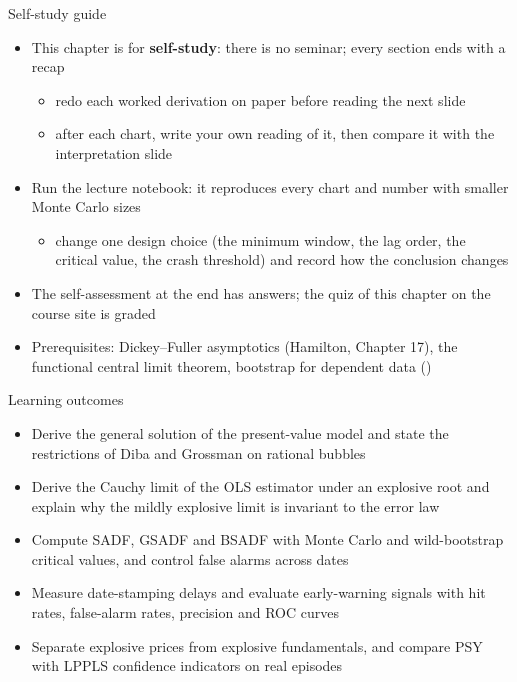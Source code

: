 \begin{frame}{Self-study guide}
\itemsize{\small}
\begin{itemize}
    \item This chapter is for \textbf{self-study}: there is no seminar; every section ends with a recap
    \begin{itemize}
        \item redo each worked derivation on paper before reading the next slide
        \item after each chart, write your own reading of it, then compare it with the interpretation slide
    \end{itemize}
    \item Run the lecture notebook: it reproduces every chart and number with smaller Monte Carlo sizes
    \begin{itemize}
        \item change one design choice (the minimum window, the lag order, the critical value, the crash threshold) and record how the conclusion changes
    \end{itemize}
    \item The self-assessment at the end has answers; the quiz of this chapter on the course site is graded
    \item Prerequisites: Dickey--Fuller asymptotics (Hamilton, Chapter 17), the functional central limit theorem, bootstrap for dependent data ()
\end{itemize}
\end{frame}

\begin{frame}{Learning outcomes}
\itemsize{\small}
\begin{itemize}
    \item Derive the general solution of the present-value model and state the restrictions of Diba and Grossman on rational bubbles
    \item Derive the Cauchy limit of the OLS estimator under an explosive root and explain why the mildly explosive limit is invariant to the error law
    \item Compute SADF, GSADF and BSADF with Monte Carlo and wild-bootstrap critical values, and control false alarms across dates
    \item Measure date-stamping delays and evaluate early-warning signals with hit rates, false-alarm rates, precision and ROC curves
    \item Separate explosive prices from explosive fundamentals, and compare PSY with LPPLS confidence indicators on real episodes
\end{itemize}
\end{frame}

